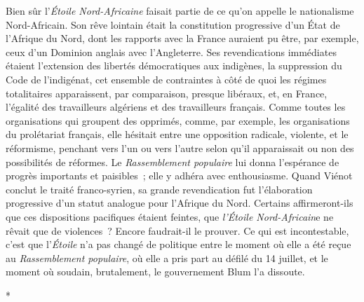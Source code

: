 \documentclass[french,twoside]{book} %
\begin{document}
Bien sûr l'{\itshape Étoile Nord-Africaine} faisait partie de ce qu'on appelle le nationalisme Nord-Africain. Son rêve lointain était la constitution progressive d'un État de l'Afrique du Nord, dont les rapports avec la France auraient pu être, par exemple, ceux d'un Dominion anglais avec l'Angleterre. Ses reven­dications immédiates étaient l'extension des libertés démocratiques aux indigènes, la suppression du Code de l'indigénat, cet ensemble de contraintes à côté de quoi les régimes totalitaires apparaissent, par comparaison, presque libéraux, et, en France, l'égalité des travailleurs algériens et des travailleurs français. Comme toutes les organisations qui groupent des opprimés, comme, par exemple, les organisations du prolétariat français, elle hésitait entre une opposition radicale, violente, et le réformisme, penchant vers l'un ou vers l'autre selon qu'il apparaissait ou non des possibilités de réformes. Le {\itshape Rassem­blement populaire} lui donna l'espérance de progrès importants et paisibles ; elle y adhéra avec enthousiasme. Quand Viénot conclut le traité franco-syrien, sa grande revendication fut l'élaboration progressive d'un statut analogue pour l'Afrique du Nord. Certains affirmeront-ils que ces dispositions pacifiques étaient feintes, que {\itshape l'Étoile Nord-Africain}e ne rêvait que de violences ? Encore faudrait-il le prouver. Ce qui est incontestable, c'est que l'{\itshape Étoile} n'a pas changé de politique entre le moment où elle a été reçue au {\itshape Rassemblement populaire}, où elle a pris part au défilé du 14 juillet, et le moment où soudain, brutalement, le gouvernement Blum l'a dissoute.\par

\begin{center}
\noindent \centerline{*}\par
\end{center}
\end{document}
